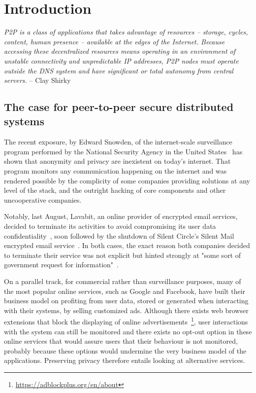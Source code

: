 \chapter{Introduction}

\textit{P2P is a class of applications that takes advantage of resources -- storage, cycles, content, human presence -- available at the edges of the Internet. Because accessing these decentralized resources means operating in an environment of unstable connectivity and unpredictable IP addresses, P2P nodes must operate outside the DNS system and have significant or total autonomy from central servers.} -- Clay Shirky~\cite{Shirky:2000}


\section{The case for peer-to-peer secure distributed systems}

The recent exposure, by Edward Snowden, of the internet-scale surveillance program performed by the National Security Agency in the United States~\cite{Schneier:2013} has shown that anonymity and privacy are inexistent on today's internet. That program monitors any communication happening on the internet and was rendered possible by the complicity of some companies providing solutions at any level of the stack, and the outright hacking of core components and other uncooperative companies.

Notably, last August, Lavabit, an online provider of encrypted email services, decided to terminate its activities to avoid compromising its user data confidentiality~\cite{Lavabit:2013}, soon followed by the shutdown of Silent Circle's Silent Mail encrypted email service~\cite{SilentCircle:2013}. In both cases, the exact reason both companies decided to terminate their service was not explicit but hinted strongly at "some sort of government request for information"~\cite{Tsukayama:2013}. 

On a parallel track, for commercial rather than surveillance purposes, many of the most popular online services, such as Google and Facebook, have built their business model on profiting from user data, stored or generated when interacting with their systems, by selling customized ads. Although there exists web browser extensions that block the displaying of online advertisements~\footnote{\url{https://adblockplus.org/en/about}}, user interactions with the system can still be monitored and there exists no opt-out option in these online services that would assure users that their behaviour is not monitored, probably because these options would undermine the very business model of the applications. Preserving privacy therefore entails looking at alternative services.

